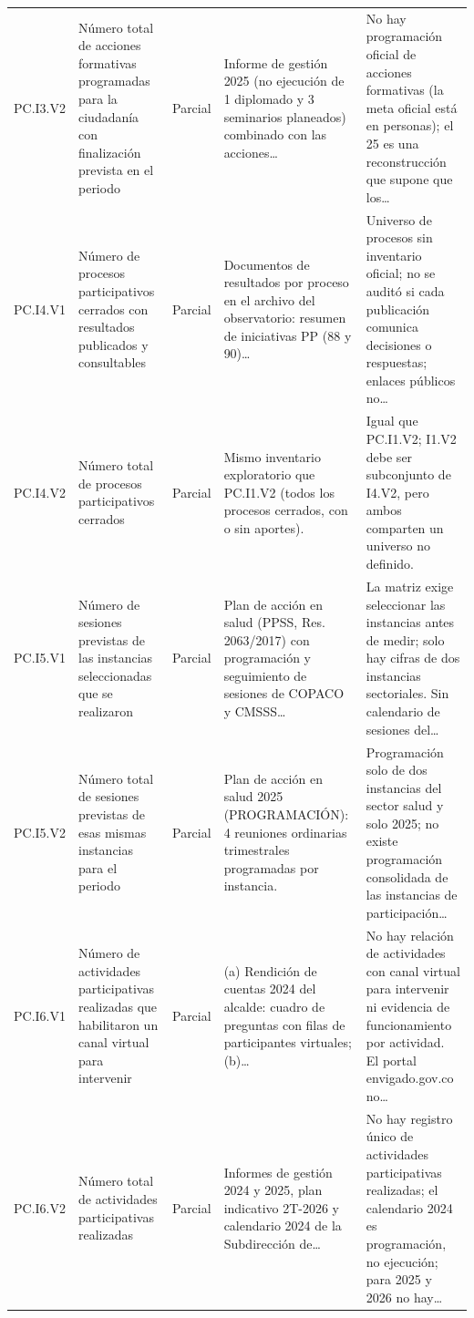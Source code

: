\documentclass[11pt,letterpaper]{article}
\begin{document}
{\begin{xltabular}{\linewidth}{L{1.9cm}YL{1.9cm}YY}
PC.I3.V2 & Número total de acciones formativas programadas para la ciudadanía con finalización prevista en el periodo & Parcial & Informe de gestión 2025 (no ejecución de 1 diplomado y 3 seminarios planeados) combinado con las acciones\ldots{} & No hay programación oficial de acciones formativas (la meta oficial está en personas); el 25 es una reconstrucción que supone que los\ldots{} \\
PC.I4.V1 & Número de procesos participativos cerrados con resultados publicados y consultables & Parcial & Documentos de resultados por proceso en el archivo del observatorio: resumen de iniciativas PP (88 y 90)\ldots{} & Universo de procesos sin inventario oficial; no se auditó si cada publicación comunica decisiones o respuestas; enlaces públicos no\ldots{} \\
PC.I4.V2 & Número total de procesos participativos cerrados & Parcial & Mismo inventario exploratorio que PC.I1.V2 (todos los procesos cerrados, con o sin aportes). & Igual que PC.I1.V2; I1.V2 debe ser subconjunto de I4.V2, pero ambos comparten un universo no definido. \\
PC.I5.V1 & Número de sesiones previstas de las instancias seleccionadas que se realizaron & Parcial & Plan de acción en salud (PPSS, Res. 2063/2017) con programación y seguimiento de sesiones de COPACO y CMSSS\ldots{} & La matriz exige seleccionar las instancias antes de medir; solo hay cifras de dos instancias sectoriales. Sin calendario de sesiones del\ldots{} \\
PC.I5.V2 & Número total de sesiones previstas de esas mismas instancias para el periodo & Parcial & Plan de acción en salud 2025 (PROGRAMACIÓN): 4 reuniones ordinarias trimestrales programadas por instancia. & Programación solo de dos instancias del sector salud y solo 2025; no existe programación consolidada de las instancias de participación\ldots{} \\
PC.I6.V1 & Número de actividades participativas realizadas que habilitaron un canal virtual para intervenir & Parcial & (a) Rendición de cuentas 2024 del alcalde: cuadro de preguntas con filas de participantes virtuales; (b)\ldots{} & No hay relación de actividades con canal virtual para intervenir ni evidencia de funcionamiento por actividad. El portal envigado.gov.co no\ldots{} \\
PC.I6.V2 & Número total de actividades participativas realizadas & Parcial & Informes de gestión 2024 y 2025, plan indicativo 2T-2026 y calendario 2024 de la Subdirección de\ldots{} & No hay registro único de actividades participativas realizadas; el calendario 2024 es programación, no ejecución; para 2025 y 2026 no hay\ldots{} \\
\end{xltabular}
}
\end{document}
